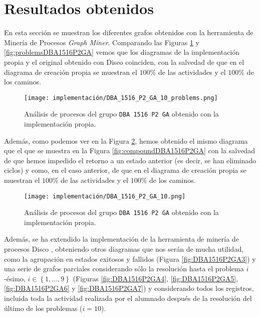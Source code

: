 \section{Resultados obtenidos}

En esta sección se muestran los diferentes grafos obtenidos con la herramienta de Minería de Procesos \emph{Graph Miner}. Comparando las Figuras \ref{fig:DBA1516P2GA1} y \ref{fig:problemsDBA1516P2GA} vemos que los diagramas de la implementación propia y el original obtenido con Disco coinciden, con la salvedad de que en el diagrama de creación propia se muestran el $100\%$ de las actividades y el $100\%$ de los caminos.

\begin{figure}[H]
    \centering
    \texttt{[image: implementación/DBA\_1516\_P2\_GA\_10\_problems.png]}
    \caption{Análisis de procesos del grupo \texttt{DBA 1516 P2 GA} obtenido con la implementación propia.}
    \label{fig:DBA1516P2GA1}
\end{figure}

Además, como podemos ver en la Figura \ref{fig:DBA1516P2GA2}, hemos obtenido el mismo diagrama que el que se muestra en la Figura \ref{fig:compoundDBA1516P2GA} con la salvedad de que hemos impedido el retorno a un estado anterior (es decir, se han eliminado ciclos) y como, en el caso anterior, de que en el diagrama de creación propia se muestran el $100\%$ de las actividades y el $100\%$ de los caminos.

\begin{figure}[H]
    \centering
    \texttt{[image: implementación/DBA\_1516\_P2\_GA\_10.png]}
    \caption{Análisis de procesos del grupo \texttt{DBA 1516 P2 GA} obtenido con la implementación propia.}
    \label{fig:DBA1516P2GA2}
\end{figure}

Además, se ha extendido la implementación de la herramienta de minería de procesos Disco \cite{gunther2012disco}, obteniendo otros diagramas que nos serán de mucha utilidad, como la agrupación en estados exitosos y fallidos (Figura \ref{fig:DBA1516P2GA3}) y una serie de grafos parciales considerando sólo la resolución hasta el problema $i$-ésimo, $i \in \left\lbrace 1,\dots,9 \right\rbrace$ (Figuras \ref{fig:DBA1516P2GA4}, \ref{fig:DBA1516P2GA5}, \ref{fig:DBA1516P2GA6} y \ref{fig:DBA1516P2GA7}) y considerando todos los registros, incluida toda la actividad realizada por el alumnado después de la resolución del último de los problemas ($i = 10$).

